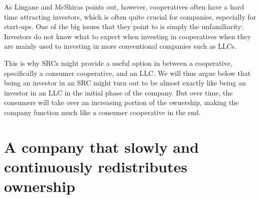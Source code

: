 \documentclass{article}
\begin{document}
As Lingane and McShiras \cite{Lingane and McShiras} %
points out, however, cooperatives often have a hard time attracting investors, which is often quite crucial for companies, especially for start-ups. %
One of the big issues that they point to is simply the unfamiliarity: Investors do not know what to expect when investing in cooperatives when they are mainly used to investing in more conventional companies such as LLCs. 

This is why SRCs might provide a useful option in between a cooperative, specifically a consumer cooperative, and an LLC. We will thus argue below that being an investor in an SRC might turn out to be almost exactly like being an investor in an LLC in the initial phase of the company. But over time, the consumers will take over an increasing portion of the ownership, making the company function much like a consumer cooperative in the end. 




\section{A company that slowly and continuously redistributes ownership}
\label{sect_def}


\end{document}
